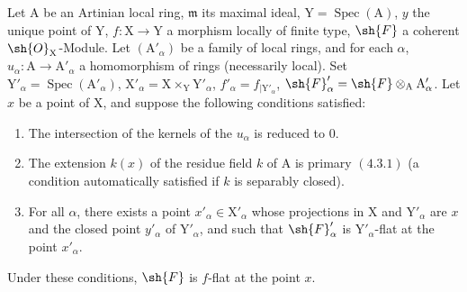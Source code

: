 \begin{proposition}[11.4.11]
\label{IV.11.4.11}
Let $\mathrm{A}$ be an Artinian local ring, $\mathfrak{m}$ its maximal ideal,
$\mathrm{Y}=\operatorname{Spec}(\mathrm{A})$, $y$ the unique point of $\mathrm{Y}$, $f:\mathrm{X}\to\mathrm{Y}$ a morphism locally of finite type, $\sh{F}$ a
coherent $\sh{O}_\mathrm{X}$-Module. Let $(\mathrm{A}'_\alpha)$ be a family of local rings, and for each $\alpha$, $u_\alpha:\mathrm{A}\to\mathrm{A}'_\alpha$
a homomorphism of rings (necessarily local). Set $\mathrm{Y}'_\alpha=\operatorname{Spec}(\mathrm{A}'_\alpha)$, $\mathrm{X}'_\alpha=\mathrm{X}\times_\mathrm{Y}\mathrm{Y}'_\alpha$,
$f'_\alpha=f_{|\mathrm{Y}'_\alpha}$, $\sh{F}'_\alpha=\sh{F}\otimes_\mathrm{A}\mathrm{A}'_\alpha$. Let $x$ be a point
of $\mathrm{X}$, and suppose the following conditions satisfied:
\begin{enumerate}[label=(\roman*)]
  \item The intersection of the kernels of the $u_\alpha$ is reduced to $0$.
  \item The extension $k(x)$ of the residue field $k$ of $\mathrm{A}$ is primary $(4.3.1)$ (a condition automatically
  satisfied if $k$ is separably closed).
\end{enumerate}
\begin{enumerate}[label=(\roman*)]
  \setcounter{enumi}{2}
  \item For all $\alpha$, there exists a point $x'_\alpha\in\mathrm{X}'_\alpha$ whose projections in $\mathrm{X}$ and $\mathrm{Y}'_\alpha$
  are $x$ and the closed point $y'_\alpha$ of $\mathrm{Y}'_\alpha$, and such that $\sh{F}'_\alpha$ is $\mathrm{Y}'_\alpha$-flat at the point $x'_\alpha$.
\end{enumerate}

Under these conditions, $\sh{F}$ is $f$-flat at the point $x$.
\end{proposition}

